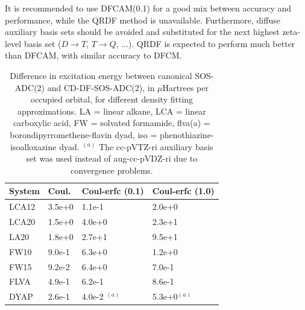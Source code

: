 It is recommended to use DFCAM(0.1) for a good mix between accuracy and performance, while the QRDF method is unavailable. Furthermore, diffuse auxiliary basis sets should be avoided and substituted for the next highest zeta-level basis set ($D \rightarrow T$, $T \rightarrow Q$, ...). QRDF is expected to perform much better than DFCAM, with similar accuracy to DFCM.

\begin{table}
\centering
\begin{tabular}{llll}
\hline
System & Coul. & Coul-erfc (0.1) & Coul-erfc (1.0) \\
\hline
LCA12 &	3.5e+0	& 1.1e-1 &	2.0e+0 \\
LCA20 & 	1.5e+0	& 4.0e+0 &	2.3e+1 \\
LA20 & 1.8e+0	& 2.7e+1	 & 9.5e+1 \\
FW10	 & 9.0e-1	& 6.3e+0	 & 1.2e+0 \\
FW15 & 	9.2e-2	& 6.4e+0	 & 7.0e-1 \\
FLVA & 4.9e-1	& 6.2e-1	 & 8.6e-1 \\
DYAP & 2.6e-1	& 4.0e-2	$^{(a)}$ & 5.3e+0$^{(a)}$ \\
\hline
\end{tabular}
\label{tab:ES_ACCURACY}
\caption{Difference in excitation energy between canonical SOS-ADC(2) and CD-DF-SOS-ADC(2), in $\mu$Hartrees per occupied orbital, for different density fitting approximations. LA = linear alkane, LCA = linear carboxylic acid, FW = solvated formamide, flva(a) = borondipyrromethene-flavin dyad, iso = phenothiazine-isoalloxazine dyad. $^{(a)}$ The cc-pVTZ-ri auxiliary basis set was used instead of aug-cc-pVDZ-ri due to convergence problems.}
\end{table}

